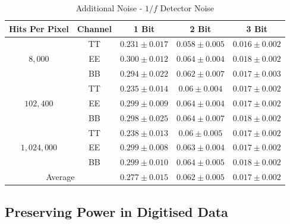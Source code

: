 \documentclass[apj]{emulateapj}
\begin{document}
\def\arraystretch{1.3}
\begin{table}[tbh]
\begin{center}
\caption{\label{tab:extranoiseoof} Additional Noise - $1/f$ Detector Noise}
\small
\begin{tabular}{c c c c c}
Hits Per Pixel & Channel & 1 Bit & 2 Bit & 3 Bit \\
\hline
\hline
\multirow{3}{*}{$8,000$}  & TT  & $ 0.231 \pm 0.017 $  & $ 0.058 \pm 0.005 $  & $ 0.016 \pm 0.002 $ \\
& EE  & $ 0.300 \pm 0.012 $  & $ 0.064 \pm 0.004 $  & $ 0.018 \pm 0.002 $ \\
& BB  & $ 0.294 \pm 0.022 $  & $ 0.062 \pm 0.007 $  & $ 0.017 \pm 0.003 $ \\
\hline
\multirow{3}{*}{$102,400$}  & TT  & $ 0.235 \pm 0.014 $  & $ 0.06 \pm 0.004 $  & $ 0.017 \pm 0.002 $ \\
& EE  & $ 0.299 \pm 0.009 $  & $ 0.064 \pm 0.004 $  & $ 0.017 \pm 0.002 $ \\
& BB  & $ 0.298 \pm 0.025 $  & $ 0.064 \pm 0.007 $  & $ 0.018 \pm 0.002 $ \\
\hline
\multirow{3}{*}{$1,024,000$}  & TT  & $ 0.238 \pm 0.013 $  & $ 0.06 \pm 0.005 $  & $ 0.017 \pm 0.002 $ \\
& EE  & $ 0.299 \pm 0.008 $  & $ 0.063 \pm 0.004 $  & $ 0.017 \pm 0.002 $ \\
& BB  & $ 0.299 \pm 0.010 $  & $ 0.064 \pm 0.005 $  & $ 0.018 \pm 0.002 $ \\
\hline
\multicolumn{2}{c}{Average}  & $ 0.277 \pm 0.015 $  & $ 0.062 \pm 0.005 $  & $ 0.017 \pm 0.002 $ \\
\end{tabular}
 \normalsize
\end{center}
\end{table}


\subsection{Preserving Power in Digitised Data}
\label{subsec:appendixpreservepower}
\end{document}
